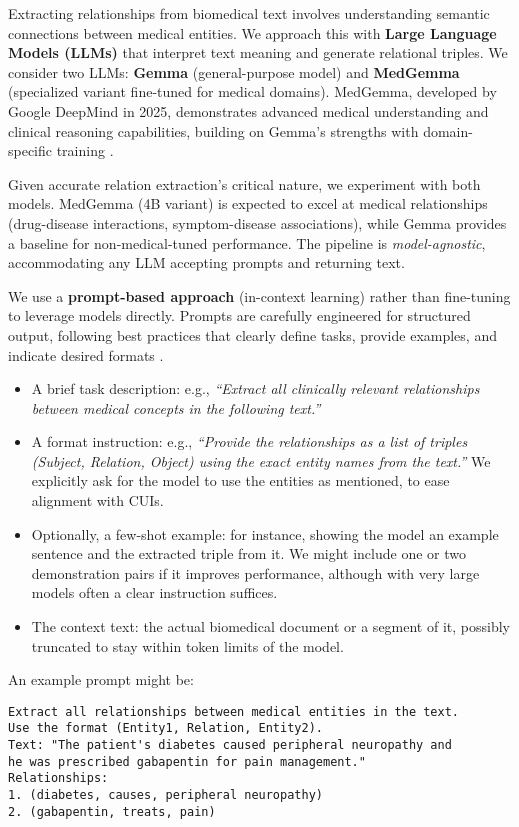 Extracting relationships from biomedical text involves understanding semantic connections between medical entities. We approach this with \textbf{Large Language Models (LLMs)} that interpret text meaning and generate relational triples. We consider two LLMs: \textbf{Gemma} (general-purpose model) and \textbf{MedGemma} (specialized variant fine-tuned for medical domains). MedGemma, developed by Google DeepMind in 2025, demonstrates advanced medical understanding and clinical reasoning capabilities, building on Gemma's strengths with domain-specific training \parencite{MedGemma2025,Gemma2025}.

Given accurate relation extraction's critical nature, we experiment with both models. MedGemma (4B variant) is expected to excel at medical relationships (drug-disease interactions, symptom-disease associations), while Gemma provides a baseline for non-medical-tuned performance. The pipeline is \textit{model-agnostic}, accommodating any LLM accepting prompts and returning text.

We use a \textbf{prompt-based approach} (in-context learning) rather than fine-tuning to leverage models directly. Prompts are carefully engineered for structured output, following best practices that clearly define tasks, provide examples, and indicate desired formats \parencite{Reynolds2021}.

\begin{itemize}
\item A brief task description: e.g., \textit{``Extract all clinically relevant relationships between medical concepts in the following text.''}
\item A format instruction: e.g., \textit{``Provide the relationships as a list of triples (Subject, Relation, Object) using the exact entity names from the text.''} We explicitly ask for the model to use the entities as mentioned, to ease alignment with CUIs.
\item Optionally, a few-shot example: for instance, showing the model an example sentence and the extracted triple from it. We might include one or two demonstration pairs if it improves performance, although with very large models often a clear instruction suffices.
\item The context text: the actual biomedical document or a segment of it, possibly truncated to stay within token limits of the model.
\end{itemize}

An example prompt might be:

\begin{verbatim}
Extract all relationships between medical entities in the text. 
Use the format (Entity1, Relation, Entity2).
Text: "The patient's diabetes caused peripheral neuropathy and 
he was prescribed gabapentin for pain management."
Relationships:
1. (diabetes, causes, peripheral neuropathy)
2. (gabapentin, treats, pain)
\end{verbatim}

